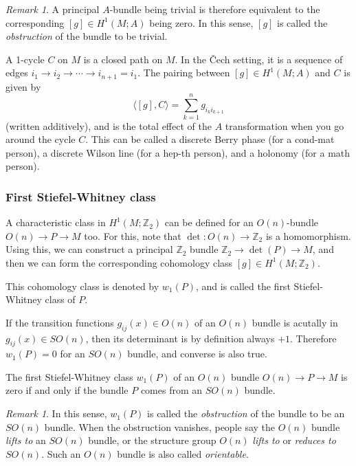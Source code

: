 \documentclass[12pt]{article}
\numberwithin{equation}{section}
\theoremstyle{remark}
\newtheorem{remark}[definition]{Remark}
\def\bZ{\mathbb{Z}}
\begin{document}
\begin{remark}
A principal $A$-bundle being trivial is therefore equivalent to the corresponding $[g]\in H^1(M;A)$ being zero.
In this sense, $[g]$ is called the \emph{obstruction} of the bundle to be trivial.
\end{remark}

A 1-cycle $C$ on $M$ is a closed path on $M$.
In the \v Cech setting, it is a sequence of edges
$i_1 \to i_2 \to \cdots \to i_{n+1}=i_1$.
The pairing between $[g]\in H^1(M;A)$ and $C$ is given by \begin{equation}
  \langle [g],C\rangle = \sum_{k=1}^{n} g_{i_k i_{k+1}}
\end{equation} (written additively),
and is the total effect of the $A$ transformation when you go around the cycle $C$.
This can be called a discrete Berry phase (for a cond-mat person),
a discrete Wilson line (for a hep-th person),
and a holonomy (for a math person).

\subsubsection{First Stiefel-Whitney class}


A characteristic class in $H^1(M;\bZ_2)$ can be defined for an $O(n)$-bundle
$O(n)\to P\to M$  too.
For this, note that $\det: O(n)\to \bZ_2$ is a homomorphism.
Using this, we can construct a principal $\bZ_2$ bundle  $\bZ_2\to \det(P)\to M$,
and then we can form the corresponding cohomology class $[g]\in H^1(M;\bZ_2)$.
\begin{definition}
  This cohomology class is denoted by $w_1(P)$, and is called the first Stiefel-Whitney class of $P$.
\end{definition}

If the transition functions $g_{ij}(x)\in O(n)$ of an $O(n)$ bundle 
is acutally in $g_{ij}(x)\in SO(n)$, then its determinant is by definition always $+1$.
Therefore $w_1(P)=0$ for an $SO(n)$ bundle,
and converse is also true.

\begin{proposition}
  The first Stiefel-Whitney class $w_1(P)$ of an $O(n)$ bundle $O(n)\to P\to M$ is zero if and only if the bundle $P$ comes from an $SO(n)$ bundle.
\end{proposition}

\begin{remark}
In this sense, $w_1(P)$ is called the \emph{obstruction} of the bundle to be an $SO(n)$ bundle.
When the obstruction vanishes, people say the $O(n)$ bundle \emph{lifts to} an $SO(n)$ bundle,
or the structure group $O(n)$ \emph{lifts to} or \emph{reduces to} $SO(n)$.
Such an $O(n)$ bundle is also called \emph{orientable}.
\end{remark}
\end{document}
